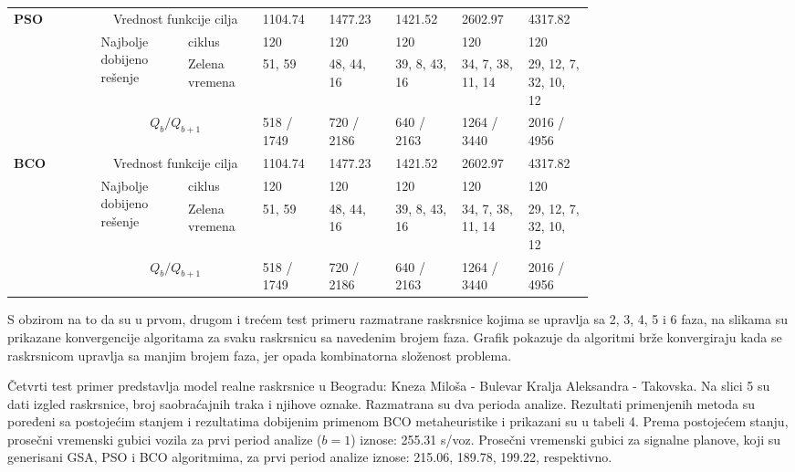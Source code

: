 \begin{table*}
\begin{center}
\begin{tabular}{p{0.12\linewidth}p{0.12\linewidth}p{0.1\linewidth}p{0.08\linewidth}p{0.08\linewidth}p{0.08\linewidth}p{0.08\linewidth}p{0.08\linewidth}}
        \hline
        \multirow{4}{4em}{\textbf{PSO}} & \multicolumn{2}{c}{Vrednost funkcije cilja}                    
        & 1104.74 & 1477.23 & 1421.52 & 2602.97 & 4317.82 \\
        \cmidrule{2-8}
        & \multirow{2}{0.9\linewidth}{Najbolje dobijeno rešenje} & ciklus 
        & 120 & 120 & 120 & 120 & 120 \\ 
                               \cmidrule{3-8}
                               &  & Zelena vremena   
        &  51, 59 &   48, 44, 16 & 39, 8, 43, 16 & 34, 7, 38, 11, 14 & 29, 12, 7, 32, 10, 12 \\
        \cmidrule{2-8}
        & \multicolumn{2}{c}{$ Q_b / Q_{b+1}$} 
        & 518 / 1749 & 720 / 2186 & 640 / 2163 & 1264 / 3440 & 2016 / 4956 \\
        \hline
        \multirow{4}{4em}{\textbf{BCO}} & \multicolumn{2}{c}{Vrednost funkcije cilja}                     
        & 1104.74 & 1477.23 & 1421.52 & 2602.97 & 4317.82 \\
        \cmidrule{2-8}
        & \multirow{2}{0.9\linewidth}{Najbolje dobijeno rešenje} & ciklus 
        & 120 & 120 & 120 & 120 & 120 \\ 
                               \cmidrule{3-8}
                               &  & Zelena vremena   
        &  51, 59 &   48, 44, 16 &  39, 8, 43, 16 &  34, 7, 38, 11, 14 &  29, 12, 7, 32, 10, 12 \\
        \cmidrule{2-8}
        & \multicolumn{2}{c}{$ Q_b / Q_{b+1}$} 
        & 518 / 1749 & 720 / 2186 & 640 / 2163 & 1264 / 3440 & 2016 / 4956 \\
      \hline
      \end{tabular}
    \end{center}
  \end{table*}
  
  
  
S obzirom na to da su u prvom, drugom i trećem test primeru razmatrane raskrsnice kojima se upravlja sa 2, 3, 4, 5 i 6 faza, na slikama su prikazane konvergencije algoritama za svaku raskrsnicu sa navedenim brojem faza. Grafik pokazuje da algoritmi brže konvergiraju kada se raskrsnicom upravlja sa manjim brojem faza, jer opada kombinatorna složenost problema.

Četvrti test primer predstavlja model realne raskrsnice u Beogradu: Kneza Miloša - Bulevar Kralja Aleksandra - Takovska. Na slici 5 su dati izgled raskrsnice, broj saobraćajnih traka i njihove oznake. Razmatrana su dva perioda analize. Rezultati primenjenih metoda su poređeni sa postojećim stanjem i rezultatima dobijenim primenom BCO metaheuristike i prikazani su u tabeli 4. Prema postojećem stanju, prosečni vremenski gubici vozila za prvi period analize ($b=1$) iznose: 255.31 s/voz. Prosečni vremenski gubici za signalne planove, koji su generisani GSA, PSO i BCO algoritmima, za prvi period analize iznose: 215.06, 189.78, 199.22, respektivno. 

